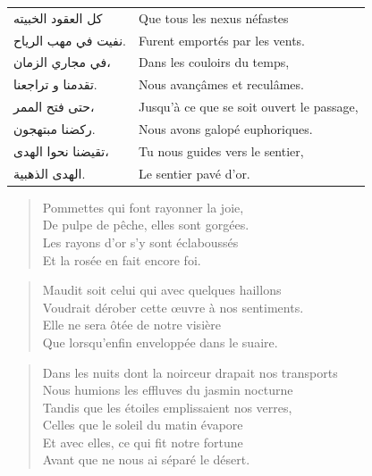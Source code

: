 \begin{longtable}{R{0.3\textwidth} L{0.65\textwidth}}
  \textarabic{كل العقود الخبيته}     & Que tous les nexus néfastes\\  %
  \textarabic{نفيت في مهب الرياح.}   & Furent emportés par les vents.\bigskip \\ 
  \textarabic{في مجاري الزمان،}      & Dans les couloirs du temps,\\  %
  \textarabic{تقدمنا و تراجعنا.}     & Nous avançâmes et reculâmes.\bigskip \\ 
  \textarabic{حتى فتح الممر،}        & Jusqu’à ce que se soit ouvert le passage,\\  %
  \textarabic{ركضنا مبتهجون.}        & Nous avons galopé euphoriques.\bigskip \\ 
  \textarabic{تقيضنا نحوا الهدى،}    & Tu nous guides vers le sentier,\\  %
  \textarabic{الهدى الذهبية.}        & Le sentier pavé d’or.\\  %
\end{longtable}

\begin{verse}\quatrain
  Pommettes qui font rayonner la joie,\\  %
  De pulpe de pêche, elles sont gorgées.\\  %
  Les rayons d’or s’y sont éclaboussés\\  %
  Et la rosée en fait encore foi.
\end{verse}


\begin{verse}\quatrain
  Maudit soit celui qui avec quelques haillons\\  %
  Voudrait dérober cette œuvre à nos sentiments.\\  %
  Elle ne sera ôtée de notre visière\\  %
  Que lorsqu’enfin enveloppée dans le suaire.\\  %
\end{verse}


\begin{verse}\sizain
  Dans les nuits dont la noirceur drapait nos transports\\  %
  Nous humions les effluves du jasmin nocturne\\  %
  Tandis que les étoiles emplissaient nos verres,\\  %
  Celles que le soleil du matin évapore\\  %
  Et avec elles, ce qui fit notre fortune\\  %
  Avant que ne nous ai séparé le désert.
\end{verse}


